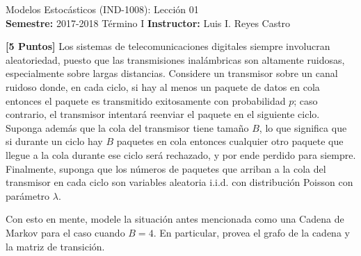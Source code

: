 \documentclass[ a4paper, twoside, 11pt]{article}
\newcommand{\numero}{01}
\begin{document}
\allowdisplaybreaks

\begin{center}
\Large Modelos Estoc\'asticos (IND-1008): Lecci\'on \numero \\[1ex]
\small \textbf{Semestre:} 2017-2018 T\'ermino I \qquad
\textbf{Instructor:} Luis I. Reyes Castro
\end{center}
\halfskip



\begin{problem}
\textbf{[5 Puntos]} Los sistemas de telecomunicaciones digitales siempre involucran aleatoriedad, puesto que las transmisiones inal\'ambricas son altamente ruidosas, especialmente sobre largas distancias. Considere un transmisor sobre un canal ruidoso donde, en cada ciclo, \linebreak si hay al menos un paquete de datos en cola entonces el paquete es transmitido exitosamente con probabilidad $p$; caso contrario, el transmisor intentar\'a reenviar el paquete en el siguiente ciclo. Suponga adem\'as que la cola del transmisor tiene tama\~no $B$, lo que significa que si durante un ciclo hay $B$ paquetes en cola entonces cualquier otro paquete que llegue a la cola durante ese ciclo ser\'a rechazado, y por ende perdido para siempre. Finalmente, suponga que los n\'umeros de paquetes que arriban a la cola del transmisor en cada ciclo son variables aleatoria i.i.d. con distribuci\'on Poisson con par\'ametro $\lambda$. 

Con esto en mente, modele la situaci\'on antes mencionada como una Cadena de Markov para el caso cuando $B = 4$. En particular, provea el grafo de la cadena y la matriz de transici\'on. 


\end{problem}
\end{document}
